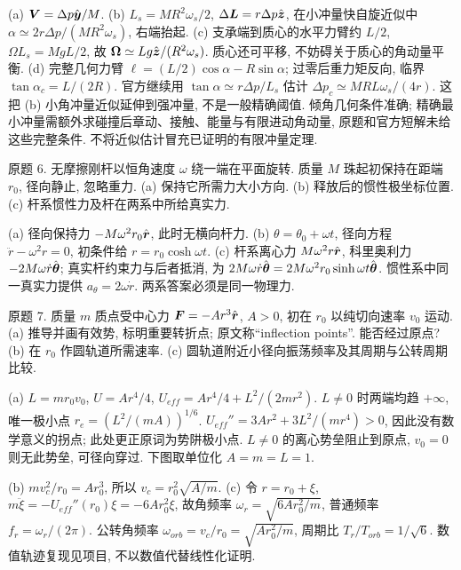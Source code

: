 \begin{solution}
(a) $\boldsymbol{V}=\Delta p\hat{\boldsymbol{y}}/M$. (b) $L_s=MR^2\omega_s/2$, $\Delta\boldsymbol{L}=r\Delta p\hat{\boldsymbol{z}}$, 在小冲量快自旋近似中 $\alpha\simeq2r\Delta p/(MR^2\omega_s)$, 右端抬起. (c) 支承端到质心的水平力臂约 $L/2$, $\Omega L_s=MgL/2$, 故 $\boldsymbol{\Omega}\simeq Lg\hat{\boldsymbol{z}}/(R^2\omega_s)$. 质心还可平移, 不妨碍关于质心的角动量平衡. (d) 完整几何力臂 $\ell=(L/2)\cos\alpha-R\sin\alpha$; 过零后重力矩反向, 临界 $\tan\alpha_c=L/(2R)$. 官方继续用 $\tan\alpha\simeq r\Delta p/L_s$ 估计 $\Delta p_c\simeq MRL\omega_s/(4r)$. 这把 (b) 小角冲量近似延伸到强冲量, 不是一般精确阈值. 倾角几何条件准确; 精确最小冲量需额外求碰撞后章动、接触、能量与有限进动角动量, 原题和官方短解未给这些完整条件. 不将近似估计冒充已证明的有限冲量定理.
\end{solution}
\begin{exercise}
原题 6. 无摩擦刚杆以恒角速度 $\omega$ 绕一端在平面旋转. 质量 $M$ 珠起初保持在距端 $r_0$, 径向静止, 忽略重力. (a) 保持它所需力大小方向. (b) 释放后的惯性极坐标位置. (c) 杆系惯性力及杆在两系中所给真实力.
\end{exercise}
\begin{solution}
(a) 径向保持力 $-M\omega^2r_0\hat{\boldsymbol{r}}$, 此时无横向杆力. (b) $\theta=\theta_0+\omega t$, 径向方程 $\ddot r-\omega^2r=0$, 初条件给 $r=r_0\cosh\omega t$. (c) 杆系离心力 $M\omega^2r\hat{\boldsymbol{r}}$, 科里奥利力 $-2M\omega\dot r\hat{\boldsymbol{\theta}}$; 真实杆约束力与后者抵消, 为 $2M\omega\dot r\hat{\boldsymbol{\theta}}=2M\omega^2r_0\sinh\omega t\hat{\boldsymbol{\theta}}$. 惯性系中同一真实力提供 $a_\theta=2\omega\dot r$. 两系答案必须是同一物理力.
\end{solution}
\begin{exercise}
原题 7. 质量 $m$ 质点受中心力 $\boldsymbol{F}=-Ar^3\hat{\boldsymbol{r}}$, $A>0$, 初在 $r_0$ 以纯切向速率 $v_0$ 运动. (a) 推导并画有效势, 标明重要转折点; 原文称“inflection points”. 能否经过原点? (b) 在 $r_0$ 作圆轨道所需速率. (c) 圆轨道附近小径向振荡频率及其周期与公转周期比较.
\end{exercise}
\begin{solution}
(a) $L=mr_0v_0$, $U=Ar^4/4$, $U_{eff}=Ar^4/4+L^2/(2mr^2)$. $L\ne0$ 时两端均趋 $+\infty$, 唯一极小点 $r_e=(L^2/(mA))^{1/6}$. $U_{eff}''=3Ar^2+3L^2/(mr^4)>0$, 因此没有数学意义的拐点; 此处更正原词为势阱极小点. $L\ne0$ 的离心势垒阻止到原点, $v_0=0$ 则无此势垒, 可径向穿过. 下图取单位化 $A=m=L=1$.
\begin{center}\end{center}
(b) $mv_c^2/r_0=Ar_0^3$, 所以 $v_c=r_0^2\sqrt{A/m}$. (c) 令 $r=r_0+\xi$, $m\ddot\xi=-U_{eff}''(r_0)\xi=-6Ar_0^2\xi$, 故角频率 $\omega_r=\sqrt{6Ar_0^2/m}$, 普通频率 $f_r=\omega_r/(2\pi)$. 公转角频率 $\omega_{orb}=v_c/r_0=\sqrt{Ar_0^2/m}$, 周期比 $T_r/T_{orb}=1/\sqrt6$. 数值轨迹复现见项目, 不以数值代替线性化证明.
\end{solution}

